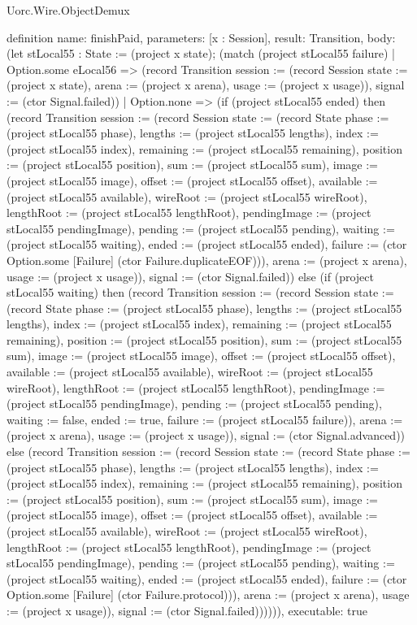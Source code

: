 \begin{lexlean}{Uorc.Wire.ObjectDemux}
\begin{semanticmodule}
definition{
  name: finishPaid,
  parameters: [x : Session],
  result: Transition,
  body: (let stLocal55 : State := (project x state); (match (project stLocal55 failure)
    | Option.some eLocal56 => (record Transition {session := (record Session {state := (project x state), arena := (project x arena), usage := (project x usage)}), signal := (ctor Signal.failed)})
    | Option.none => (if (project stLocal55 ended) then (record Transition {session := (record Session {state := (record State {phase := (project stLocal55 phase), lengths := (project stLocal55 lengths), index := (project stLocal55 index), remaining := (project stLocal55 remaining), position := (project stLocal55 position), sum := (project stLocal55 sum), image := (project stLocal55 image), offset := (project stLocal55 offset), available := (project stLocal55 available), wireRoot := (project stLocal55 wireRoot), lengthRoot := (project stLocal55 lengthRoot), pendingImage := (project stLocal55 pendingImage), pending := (project stLocal55 pending), waiting := (project stLocal55 waiting), ended := (project stLocal55 ended), failure := (ctor Option.some [Failure] (ctor Failure.duplicateEOF))}), arena := (project x arena), usage := (project x usage)}), signal := (ctor Signal.failed)}) else (if (project stLocal55 waiting) then (record Transition {session := (record Session {state := (record State {phase := (project stLocal55 phase), lengths := (project stLocal55 lengths), index := (project stLocal55 index), remaining := (project stLocal55 remaining), position := (project stLocal55 position), sum := (project stLocal55 sum), image := (project stLocal55 image), offset := (project stLocal55 offset), available := (project stLocal55 available), wireRoot := (project stLocal55 wireRoot), lengthRoot := (project stLocal55 lengthRoot), pendingImage := (project stLocal55 pendingImage), pending := (project stLocal55 pending), waiting := false, ended := true, failure := (project stLocal55 failure)}), arena := (project x arena), usage := (project x usage)}), signal := (ctor Signal.advanced)}) else (record Transition {session := (record Session {state := (record State {phase := (project stLocal55 phase), lengths := (project stLocal55 lengths), index := (project stLocal55 index), remaining := (project stLocal55 remaining), position := (project stLocal55 position), sum := (project stLocal55 sum), image := (project stLocal55 image), offset := (project stLocal55 offset), available := (project stLocal55 available), wireRoot := (project stLocal55 wireRoot), lengthRoot := (project stLocal55 lengthRoot), pendingImage := (project stLocal55 pendingImage), pending := (project stLocal55 pending), waiting := (project stLocal55 waiting), ended := (project stLocal55 ended), failure := (ctor Option.some [Failure] (ctor Failure.protocol))}), arena := (project x arena), usage := (project x usage)}), signal := (ctor Signal.failed)}))))),
  executable: true
}


\end{semanticmodule}
\end{lexlean}
